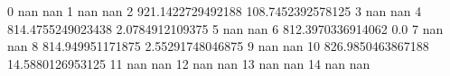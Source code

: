 0 nan nan
1 nan nan
2 921.1422729492188 108.7452392578125
3 nan nan
4 814.4755249023438 2.0784912109375
5 nan nan
6 812.3970336914062 0.0
7 nan nan
8 814.949951171875 2.55291748046875
9 nan nan
10 826.9850463867188 14.5880126953125
11 nan nan
12 nan nan
13 nan nan
14 nan nan
